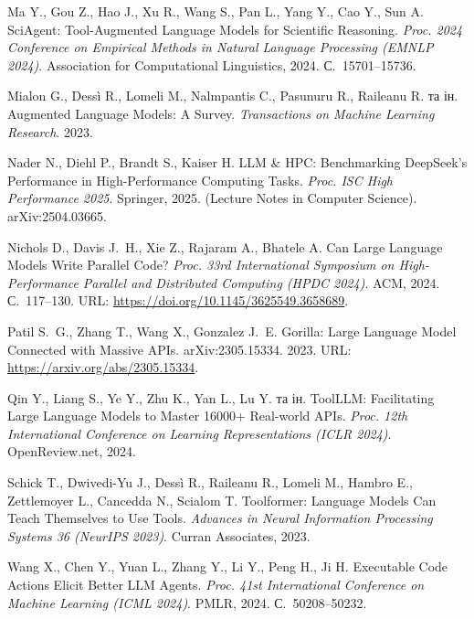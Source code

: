 \begin{citreflist}
\item Ma Y., Gou Z., Hao J., Xu R., Wang S., Pan L., Yang Y., Cao Y., Sun A.
  SciAgent: Tool-Augmented Language Models for Scientific Reasoning.
  \textit{Proc. 2024 Conference on Empirical Methods in Natural Language Processing (EMNLP 2024)}.
  Association for Computational Linguistics, 2024.
  С.~15701--15736.

\item Mialon G., Dessì R., Lomeli M., Nalmpantis C., Pasunuru R.,
  Raileanu R. та ін.
  Augmented Language Models: A Survey.
  \textit{Transactions on Machine Learning Research}. 2023.

\item Nader N., Diehl P., Brandt S., Kaiser H.
  LLM \& HPC: Benchmarking DeepSeek's Performance in High-Performance Computing Tasks.
  \textit{Proc. ISC High Performance 2025}.
  Springer, 2025.
  (Lecture Notes in Computer Science).
  arXiv:2504.03665.

\item Nichols D., Davis J.~H., Xie Z., Rajaram A., Bhatele A.
  Can Large Language Models Write Parallel Code?
  \textit{Proc. 33rd International Symposium on High-Performance Parallel and Distributed Computing (HPDC 2024)}.
  ACM, 2024.
  С.~117--130.
  URL: \url{https://doi.org/10.1145/3625549.3658689}.

\item Patil S.~G., Zhang T., Wang X., Gonzalez J.~E.
  Gorilla: Large Language Model Connected with Massive APIs.
  arXiv:2305.15334. 2023.
  URL: \url{https://arxiv.org/abs/2305.15334}.

\item Qin Y., Liang S., Ye Y., Zhu K., Yan L., Lu Y. та ін.
  ToolLLM: Facilitating Large Language Models to Master 16000+ Real-world APIs.
  \textit{Proc. 12th International Conference on Learning Representations (ICLR 2024)}.
  OpenReview.net, 2024.

\item Schick T., Dwivedi-Yu J., Dessì R., Raileanu R., Lomeli M., Hambro E.,
  Zettlemoyer L., Cancedda N., Scialom T.
  Toolformer: Language Models Can Teach Themselves to Use Tools.
  \textit{Advances in Neural Information Processing Systems 36 (NeurIPS 2023)}.
  Curran Associates, 2023.

\item Wang X., Chen Y., Yuan L., Zhang Y., Li Y., Peng H., Ji H.
  Executable Code Actions Elicit Better LLM Agents.
  \textit{Proc. 41st International Conference on Machine Learning (ICML 2024)}.
  PMLR, 2024.
  С.~50208--50232.


\end{citreflist}
